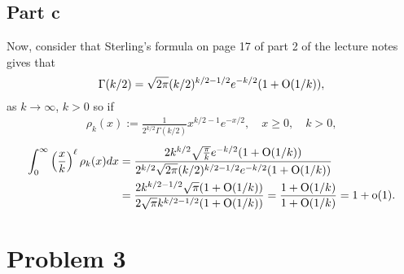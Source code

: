 \documentclass{article}
\begin{document}
\subsection{Part c}
Now, consider that Sterling's formula on page 17 of part 2 of the lecture notes gives that
\[
\Gamma(k/2)=\sqrt{2\pi}(k/2)^{k/2-1/2}e^{-k/2}(1+\operatorname{O}(1/k)),
\]
as $k\to\infty$, $k>0$ so if 
\begin{align*}
    \rho_k(x) := \frac{1}{2^{k/2} \Gamma(k/2)} x^{k/2-1} e^{-x/2}, \quad x \geq 0, \quad k > 0,
  \end{align*}
\begin{align*}
    \int_0^\infty \left( \frac{x}{k} \right)^\ell \rho_k(x) d x &=\frac{2k^{k/2}\sqrt{\frac{\pi}{k}}e^{-k/2}(1+\operatorname{O}(1/k))}{2^{k/2}\sqrt{2\pi}(k/2)^{k/2-1/2}e^{-k/2}(1+\operatorname{O}(1/k))}\\&=
    \frac{2k^{k/2-1/2}\sqrt{\pi}(1+\operatorname{O}(1/k))}{2\sqrt{\pi}k^{k/2-1/2}(1+\operatorname{O}(1/k))}=\frac{1+\operatorname{O}(1/k)}{1+\operatorname{O}(1/k)}=1+\operatorname{o}(1).
  \end{align*}

\section{Problem 3}
\end{document}
